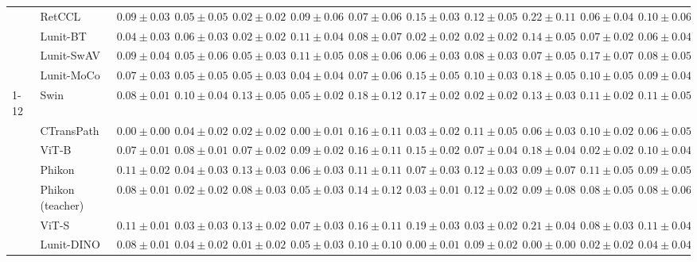 \begin{tabular}{ll|cccc|c|cccc|c}
 & RetCCL & $0.09 \pm 0.03$ & $0.05 \pm 0.05$ & $0.02 \pm 0.02$ & $0.09 \pm 0.06$ & $0.07 \pm 0.06$ & $0.15 \pm 0.03$ & $0.12 \pm 0.05$ & $0.22 \pm 0.11$ & $0.06 \pm 0.04$ & $0.10 \pm 0.06$ \\
 & Lunit-BT & $0.04 \pm 0.03$ & $0.06 \pm 0.03$ & $\mathbf{0.02 \pm 0.02}$ & $0.11 \pm 0.04$ & $0.08 \pm 0.07$ & $0.02 \pm 0.02$ & $\mathbf{0.02 \pm 0.02}$ & $0.14 \pm 0.05$ & $0.07 \pm 0.02$ & $0.06 \pm 0.04$ \\
 & Lunit-SwAV & $0.09 \pm 0.04$ & $0.05 \pm 0.06$ & $0.05 \pm 0.03$ & $0.11 \pm 0.05$ & $0.08 \pm 0.06$ & $0.06 \pm 0.03$ & $0.08 \pm 0.03$ & $0.07 \pm 0.05$ & $0.17 \pm 0.07$ & $0.08 \pm 0.05$ \\
 & Lunit-MoCo & $0.07 \pm 0.03$ & $0.05 \pm 0.05$ & $0.05 \pm 0.03$ & $0.04 \pm 0.04$ & $0.07 \pm 0.06$ & $0.15 \pm 0.05$ & $0.10 \pm 0.03$ & $0.18 \pm 0.05$ & $0.10 \pm 0.05$ & $0.09 \pm 0.04$ \\
\cline{1-12}
\multirow[t]{12}{*}{Mean pool} & Swin & $0.08 \pm 0.01$ & $0.10 \pm 0.04$ & $0.13 \pm 0.05$ & $0.05 \pm 0.02$ & $0.18 \pm 0.12$ & $0.17 \pm 0.02$ & $\mathbf{0.02 \pm 0.02}$ & $0.13 \pm 0.03$ & $0.11 \pm 0.02$ & $0.11 \pm 0.05$ \\
 & CTransPath & $\mathbf{0.00 \pm 0.00}$ & $0.04 \pm 0.02$ & $0.02 \pm 0.02$ & $\mathbf{0.00 \pm 0.01}$ & $0.16 \pm 0.11$ & $0.03 \pm 0.02$ & $0.11 \pm 0.05$ & $0.06 \pm 0.03$ & $0.10 \pm 0.02$ & $0.06 \pm 0.05$ \\
 & ViT-B & $0.07 \pm 0.01$ & $0.08 \pm 0.01$ & $0.07 \pm 0.02$ & $0.09 \pm 0.02$ & $0.16 \pm 0.11$ & $0.15 \pm 0.02$ & $0.07 \pm 0.04$ & $0.18 \pm 0.04$ & $0.02 \pm 0.02$ & $0.10 \pm 0.04$ \\
 & Phikon & $0.11 \pm 0.02$ & $0.04 \pm 0.03$ & $0.13 \pm 0.03$ & $0.06 \pm 0.03$ & $0.11 \pm 0.11$ & $0.07 \pm 0.03$ & $0.12 \pm 0.03$ & $0.09 \pm 0.07$ & $0.11 \pm 0.05$ & $0.09 \pm 0.05$ \\
 & Phikon (teacher) & $0.08 \pm 0.01$ & $0.02 \pm 0.02$ & $0.08 \pm 0.03$ & $0.05 \pm 0.03$ & $0.14 \pm 0.12$ & $0.03 \pm 0.01$ & $0.12 \pm 0.02$ & $0.09 \pm 0.08$ & $0.08 \pm 0.05$ & $0.08 \pm 0.06$ \\
 & ViT-S & $0.11 \pm 0.01$ & $0.03 \pm 0.03$ & $0.13 \pm 0.02$ & $0.07 \pm 0.03$ & $0.16 \pm 0.11$ & $0.19 \pm 0.03$ & $0.03 \pm 0.02$ & $0.21 \pm 0.04$ & $0.08 \pm 0.03$ & $0.11 \pm 0.04$ \\
 & Lunit-DINO & $0.08 \pm 0.01$ & $0.04 \pm 0.02$ & $\mathbf{0.01 \pm 0.02}$ & $0.05 \pm 0.03$ & $\mathbf{0.10 \pm 0.10}$ & $\mathbf{0.00 \pm 0.01}$ & $0.09 \pm 0.02$ & $\mathbf{0.00 \pm 0.00}$ & $\mathbf{0.02 \pm 0.02}$ & $\mathbf{0.04 \pm 0.04}$ \\

\end{tabular}
